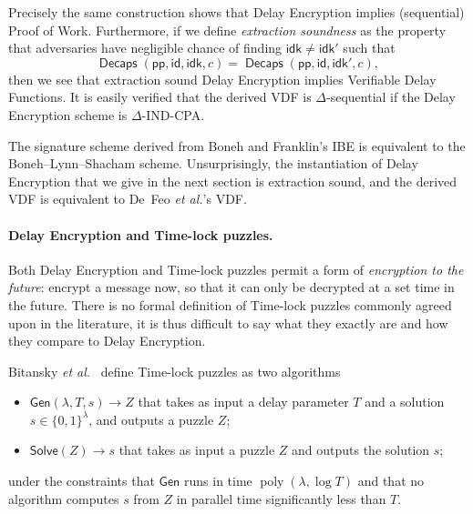 \documentclass{llncs}
\DeclareMathOperator{\poly}{poly}
\DeclareMathOperator{\Decaps}{\mathsf{Decaps}}
\newcommand{\pp}{\mathsf{pp}}
\newcommand{\id}{\mathsf{id}}
\newcommand{\idk}{\mathsf{idk}}
\begin{document}
Precisely the same construction shows that Delay Encryption implies
(sequential) Proof of Work. %
Furthermore, if we define \emph{extraction soundness} as the property
that adversaries have negligible chance of finding $\idk\ne\idk'$ such
that
\[\Decaps(\pp,\id,\idk,c) = \Decaps(\pp,\id,\idk',c),\]
then we see that extraction sound Delay Encryption implies Verifiable
Delay Functions. %
It is easily verified that the derived VDF is $\Delta$-sequential if
the Delay Encryption scheme is $\Delta$-IND-CPA.

The signature scheme derived from Boneh and Franklin's IBE is
equivalent to the Boneh--Lynn--Shacham scheme. %
Unsurprisingly, the instantiation of Delay Encryption that we give in
the next section is extraction sound, and the derived VDF is
equivalent to De~Feo \emph{et al.}'s VDF.

\paragraph{Delay Encryption and Time-lock puzzles.}
Both Delay Encryption and Time-lock puzzles permit a form of
\emph{encryption to the future}: encrypt a message now, so that it can
only be decrypted at a set time in the future. %
There is no formal definition of Time-lock puzzles commonly agreed
upon in the literature, it is thus difficult to say what they exactly
are and how they compare to Delay Encryption.

Bitansky \emph{et al.}~\cite{10.1145/2840728.2840745} define 
Time-lock puzzles as two algorithms
\begin{itemize}
\item $\mathsf{Gen}(\lambda,T, s) \to Z$ that takes as input a delay parameter
  $T$ and a solution $s\in\{0,1\}^\lambda$, and outputs a puzzle $Z$;
\item $\mathsf{Solve}(Z) \to s$ that takes as input a puzzle $Z$ and
  outputs the solution $s$;
\end{itemize}
under the constraints that $\mathsf{Gen}$ runs in time
$\poly(\lambda,\log T)$ and that no algorithm computes $s$ from $Z$ in
parallel time significantly less than $T$.
\end{document}

